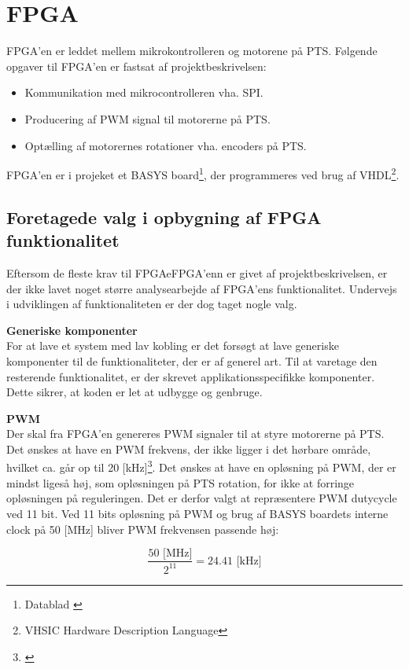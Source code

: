 \section{FPGA}
\label{sec:FPGA}
FPGA'en er leddet mellem mikrokontrolleren og motorene på PTS.
Følgende opgaver til FPGA'en er fastsat af projektbeskrivelsen:

\begin{itemize}
\itemsep1pt
	\item Kommunikation med mikrocontrolleren vha. SPI.
	\item Producering af PWM signal til motorerne på PTS.
	\item Optælling af motorernes rotationer vha. encoders på PTS.
\end{itemize}

FPGA'en er i projeket et BASYS board\footnote{Datablad \citep{basys2}}, der programmeres ved brug af VHDL\footnote{VHSIC Hardware Description Language}.

\subsection{Foretagede valg i opbygning af FPGA funktionalitet}
Eftersom de fleste krav til FPGAeFPGA'enn er givet af projektbeskrivelsen, er der ikke 
lavet noget større analysearbejde af FPGA'ens funktionalitet. Undervejs i 
udviklingen af funktionaliteten er der dog taget nogle valg.

\textbf{Generiske komponenter}\\
For at lave et system med lav kobling er det forsøgt at lave 
generiske komponenter til de funktionaliteter, der er af generel art. 
Til at varetage den resterende funktionalitet, er der skrevet applikationsspecifikke 
komponenter.
Dette sikrer, at koden er let at udbygge og genbruge.

\textbf{PWM}\\
Der skal fra FPGA'en genereres PWM signaler til at styre motorerne på PTS.
Det ønskes at have en PWM frekvens, der ikke ligger i det hørbare område, hvilket ca. går op til 20 [kHz]\footnote{\citep{Hearingrange}}. 
Det ønskes at have en opløsning på PWM, der er mindst ligeså høj, som 
opløsningen på PTS rotation, for ikke at forringe opløsningen på reguleringen. 
Det er derfor valgt at repræsentere PWM dutycycle ved 11 bit. 
Ved 11 bits opløsning på PWM og brug af BASYS boardets interne clock på 50 [MHz] bliver PWM frekvensen passende høj:

\begin{equation}
  \frac{50 \text{ [MHz]}}{2^{11}} = 24.41 \text{ [kHz]}
\end{equation}

